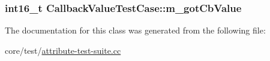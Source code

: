 \subsubsection[{\texorpdfstring{m\+\_\+got\+Cb\+Value}{m_gotCbValue}}]{\setlength{\rightskip}{0pt plus 5cm}int16\+\_\+t Callback\+Value\+Test\+Case\+::m\+\_\+got\+Cb\+Value\hspace{0.3cm}{\ttfamily [private]}}\hypertarget{classCallbackValueTestCase_ae6264f15f1300b741d5ca583de995623}{}\label{classCallbackValueTestCase_ae6264f15f1300b741d5ca583de995623}


The documentation for this class was generated from the following file\+:\begin{DoxyCompactItemize}
\item 
core/test/\hyperlink{attribute-test-suite_8cc}{attribute-\/test-\/suite.\+cc}\end{DoxyCompactItemize}

